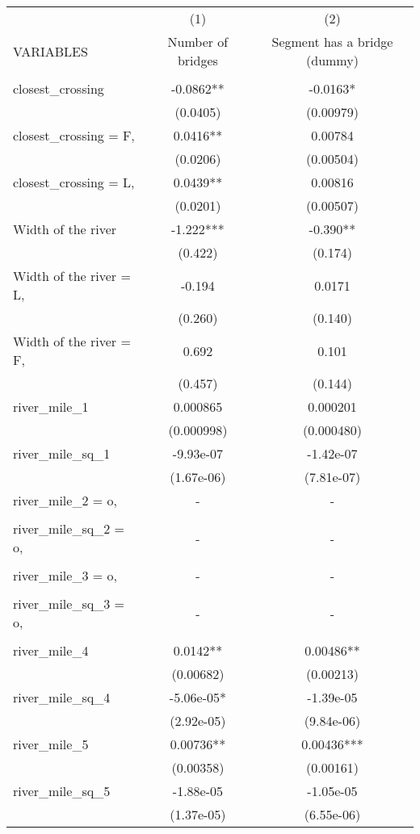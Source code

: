 \begin{tabular}{lcc} \hline
 & (1) & (2) \\
VARIABLES & Number of bridges & Segment has a bridge (dummy) \\ \hline
 &  &  \\
closest\_crossing & -0.0862** & -0.0163* \\
 & (0.0405) & (0.00979) \\
closest\_crossing = F, & 0.0416** & 0.00784 \\
 & (0.0206) & (0.00504) \\
closest\_crossing = L, & 0.0439** & 0.00816 \\
 & (0.0201) & (0.00507) \\
Width of the river & -1.222*** & -0.390** \\
 & (0.422) & (0.174) \\
Width of the river = L, & -0.194 & 0.0171 \\
 & (0.260) & (0.140) \\
Width of the river = F, & 0.692 & 0.101 \\
 & (0.457) & (0.144) \\
river\_mile\_1 & 0.000865 & 0.000201 \\
 & (0.000998) & (0.000480) \\
river\_mile\_sq\_1 & -9.93e-07 & -1.42e-07 \\
 & (1.67e-06) & (7.81e-07) \\
river\_mile\_2 = o, & - & - \\
 &  &  \\
river\_mile\_sq\_2 = o, & - & - \\
 &  &  \\
river\_mile\_3 = o, & - & - \\
 &  &  \\
river\_mile\_sq\_3 = o, & - & - \\
 &  &  \\
river\_mile\_4 & 0.0142** & 0.00486** \\
 & (0.00682) & (0.00213) \\
river\_mile\_sq\_4 & -5.06e-05* & -1.39e-05 \\
 & (2.92e-05) & (9.84e-06) \\
river\_mile\_5 & 0.00736** & 0.00436*** \\
 & (0.00358) & (0.00161) \\
river\_mile\_sq\_5 & -1.88e-05 & -1.05e-05 \\
 & (1.37e-05) & (6.55e-06) \\

\end{tabular}
